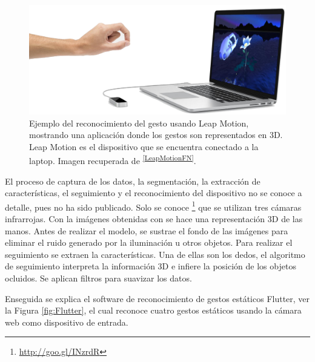 \begin{figure}[h!]
\begin{center}
\includegraphics[scale=.3]{./Figures/LeapMotion.png}
\end{center}
\caption{Ejemplo del reconocimiento del gesto usando Leap Motion, mostrando una aplicación donde los gestos son representados en 3D. Leap Motion es el dispositivo que se encuentra conectado a la laptop. Imagen recuperada de \textsuperscript{\ref{LeapMotionFN}}.}
\label{fig:LeapMotion}
\end{figure}

El proceso de captura de los datos, la segmentación, la extracción de características, el seguimiento y el reconocimiento del dispositivo no se conoce a detalle, pues no ha sido publicado.
Solo se conoce \footnote{\url{http://goo.gl/INzrdR}} que se utilizan tres cámaras infrarrojas. Con la imágenes obtenidas con se hace una representación 3D de las manos. Antes de realizar el modelo,  se sustrae el fondo de las imágenes para eliminar el ruido generado por la iluminación u otros objetos. 
Para realizar el seguimiento se extraen la características. Una de ellas son los dedos, el algoritmo de seguimiento interpreta la información 3D e infiere la posición de los objetos ocluidos. Se aplican filtros para suavizar los datos. 

Enseguida se explica el software de reconocimiento de gestos estáticos Flutter, ver la Figura \ref{fig:Flutter}, el cual reconoce cuatro gestos estáticos usando la cámara web como dispositivo de entrada. 

